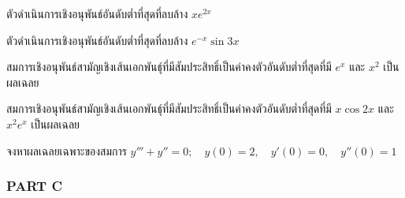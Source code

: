 \documentclass[12pt,final]{novelette} %
\begin{document}
\begin{question}[resume]
\begin{question}
        \item
        ตัวดําเนินการเชิงอนุพันธ์อันดับต่ำที่สุดที่ลบล้าง $xe^{2x}$ 



        \item
        ตัวดําเนินการเชิงอนุพันธ์อันดับต่ำที่สุดที่ลบล้าง $e^{-x}\sin 3x$ 



        \item
        สมการเชิงอนุพันธ์สามัญเชิงเส้นเอกพันธุ์ที่มีสัมประสิทธิ์เป็นค่าคงตัวอันดับต่ำที่สุดที่มี $e^x$ และ $x^2$ เป็นผลเฉลย 



        \item
        สมการเชิงอนุพันธ์สามัญเชิงเส้นเอกพันธุ์ที่มีสัมประสิทธิ์เป็นค่าคงตัวอันดับต่ำที่สุดที่มี $x \cos 2x$ และ $x^2 e^x$ เป็นผลเฉลย 


    \end{question}

    \item {}
    จงหาผลเฉลยเฉพาะของสมการ
    $y''' + y'' = 0; \quad y(0) = 2, \quad y'(0) = 0, \quad y''(0) = 1$ 


\end{question}

\subsubsection*{PART C}
\end{document}
